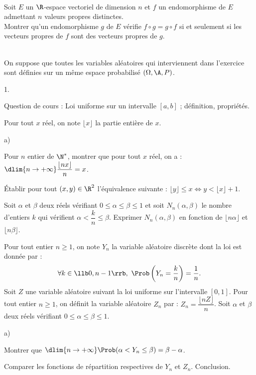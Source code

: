 \documentclass[11pt]{article}%
\begin{document}
\begin{exerciceSP}~\\
  Soit $E$ un $\R$-espace vectoriel de dimension $n$ et $f$ un
  endomorphisme de $E$ admettant $n$ valeurs propres distinctes.\\
  Montrer qu'un endomorphisme $g$ de $E$ vérifie $f\circ g = g\circ f$
  si et seulement si les vecteurs propres de $f$ sont des vecteurs
  propres de $g$.
\end{exerciceSP}


\newpage

\begin{exerciceAP}~\\
  On suppose que toutes les variables aléatoires qui interviennent
  dans l'exercice sont définies sur un même espace probabilisé
  $(\Omega, \A,P)$.
  \begin{noliste}{1.}
    \setlength{\itemsep}{2mm}
  \item Question de cours : Loi uniforme sur un intervalle $[a,b]$ ;
    définition, propriétés.
  \item Pour tout $x$ réel, on note $\lfloor x \rfloor$ la partie
    entière de $x$.
    \begin{noliste}{a)}
    \setlength{\itemsep}{2mm}
    \item Pour $n$ entier de $\N^*$, montrer que pour tout $x$ réel,
      on a : $\dlim{n\to+\infty} \dfrac{\lfloor nx\rfloor}{n}=x$.
    \item Établir pour tout $(x,y)\in\R^2$ l'équivalence suivante :
      $\lfloor y \rfloor \leq x \Leftrightarrow y < \lfloor x \rfloor
      +1$.
    \item Soit $\alpha$ et $\beta$ deux réels vérifiant $0\leq
      \alpha\leq \beta\leq 1$ et soit $N_n(\alpha,\beta)$ le nombre
      d'entiers $k$ qui vérifient $\alpha <\dfrac{k}{n}\leq
      \beta$. Exprimer $N_n(\alpha,\beta)$ en fonction de $\lfloor
      n\alpha \rfloor$ et $\lfloor n\beta \rfloor$.
    \end{noliste}
  \item Pour tout entier $n\geq 1$, on note $Y_n$ la variable
    aléatoire discrète dont la loi est donnée par :
    \[
    \forall k\in\llb 0,n-1\rrb, \ \Prob\left(Y_n=\frac{k}{n}\right)=\frac{1}{n}.
    \]
    Soit $Z$ une variable aléatoire suivant la loi uniforme sur
    l'intervalle $[0,1]$. Pour tout entier $n\geq 1$, on définit la
    variable aléatoire $Z_n$ par : $Z_n=\dfrac{\lfloor
      nZ\rfloor}{n}$. Soit $\alpha$ et $\beta$ deux réels vérifiant
    $0\leq \alpha\leq \beta\leq 1$.
    \begin{noliste}{a)}
    \setlength{\itemsep}{2mm}
    \item Montrer que $\dlim{n\to+\infty} \Prob(\alpha <Y_n\leq
      \beta)=\beta-\alpha$.
    \item Comparer les fonctions de répartition respectives de
      $Y_n$ et $Z_n$. Conclusion.
    \end{noliste}
  \end{noliste}
\end{exerciceAP}
\end{document}
